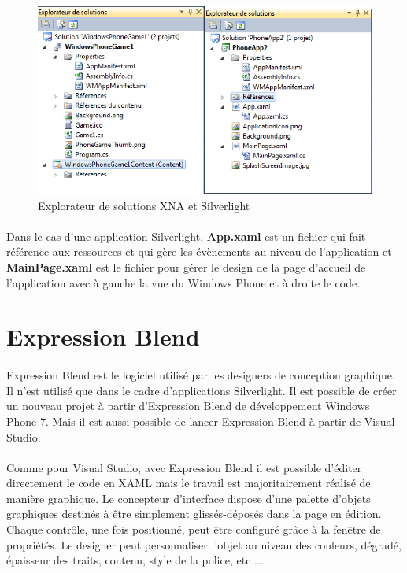 \documentclass[twoside,UTF8]{EPURapport}
\begin{document}
	\begin{figure}[H]	
		\center
		\includegraphics[scale=0.8]{images/explorateursolution.png}		
		\caption{Explorateur de solutions XNA et Silverlight}
	\end{figure}

\paragraph{}
Dans le cas d'une application Silverlight, \textbf{App.xaml} est un fichier qui fait référence aux ressources et qui gère les évènements au niveau de l'application et \textbf{MainPage.xaml}  est le fichier pour gérer le design de la page d'accueil de l'application  avec à gauche la vue du Windows Phone et à droite le code.

	\section{Expression Blend}
	
\paragraph{}
Expression Blend est le logiciel utilisé par les designers de conception graphique. Il n'est utilisé que dans le cadre d'applications Silverlight. Il est possible de créer un nouveau projet à partir d'Expression Blend de développement Windows Phone 7. Mais il est aussi possible de lancer Expression Blend à partir de Visual Studio.

\paragraph{}
Comme pour Visual Studio, avec Expression Blend il est possible d'éditer directement le code en XAML mais le travail est majoritairement réalisé de manière graphique. Le concepteur d'interface dispose d'une palette d'objets graphiques destinés à être simplement glissés-déposés dans la page en édition. Chaque contrôle, une fois positionné, peut être configuré grâce à la fenêtre de propriétés. Le designer peut personnaliser l'objet au niveau des couleurs, dégradé, épaisseur des traits, contenu, style de la police, etc ...
	
\end{document}
